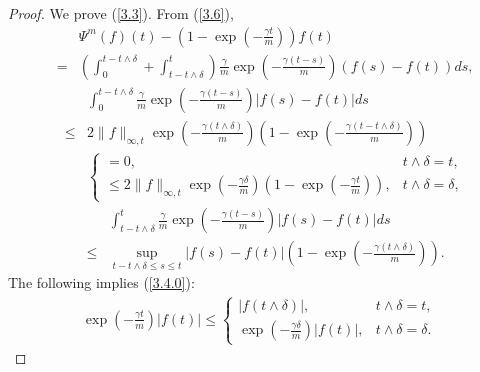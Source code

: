 \documentclass[12pt]{article}
\begin{document}
\begin{proof}
We prove  (\ref{3.3}).
From (\ref{3.6}),
\begin{eqnarray*}
&&\Psi^{m} (f)(t)-\left(1-\exp\left (-\frac{\gamma t}{m} \right)\right)f(t)\\
&=&\left(\int_0^{t-t\wedge\delta}+ \int_{t-t\wedge\delta}^t\right)\frac{\gamma}{m}
\exp\left(-\frac{\gamma (t-s)}{m} \right)(f(s)-f(t))ds,
\end{eqnarray*}
\begin{eqnarray*}
&&\int_0^{t-t\wedge\delta}\frac{\gamma}{m}\exp\left(-\frac{\gamma (t-s)}{m} \right)|f(s)-f(t)|ds\\
&\le& 2\|f\|_{\infty,t}\exp\left (-\frac{\gamma (t\wedge\delta ) }{m}\right) \left(1-\exp\left (-\frac{\gamma (t-t\wedge\delta)}{m} \right)\right)\\
&&\begin{cases}
=0,&t\wedge\delta=t,\\
\le \displaystyle 2\|f\|_{\infty,t}\exp\left (-\frac{\gamma\delta}{m} \right)\left(1-\exp\left (-\frac{\gamma t}{m} \right)\right),&t\wedge\delta=\delta,
\end{cases}
\end{eqnarray*}
\begin{eqnarray*}
&&\int_{t-t\wedge\delta}^t\frac{\gamma}{m}\exp\left(-\frac{\gamma (t-s)}{m} \right)|f(s)-f(t)|ds\\
& \le& \sup_{t-t\wedge\delta\le s\le t}|f(s)-f(t)|\left(1-\exp\left (-\frac{\gamma (t\wedge\delta )}{m} \right)\right).%
\end{eqnarray*}
The following implies (\ref{3.4.0}):
\begin{eqnarray*}
\exp\left (-\frac{\gamma t}{m} \right)|f(t)|
\le 
\begin{cases}
|f(t\wedge\delta)|,&t\wedge\delta=t,\\%
\displaystyle \exp\left (-\frac{\gamma \delta}{m} \right)|f(t)|,&t\wedge\delta=\delta.%
\end{cases}
\end{eqnarray*}
 \end{proof}

\end{document}

